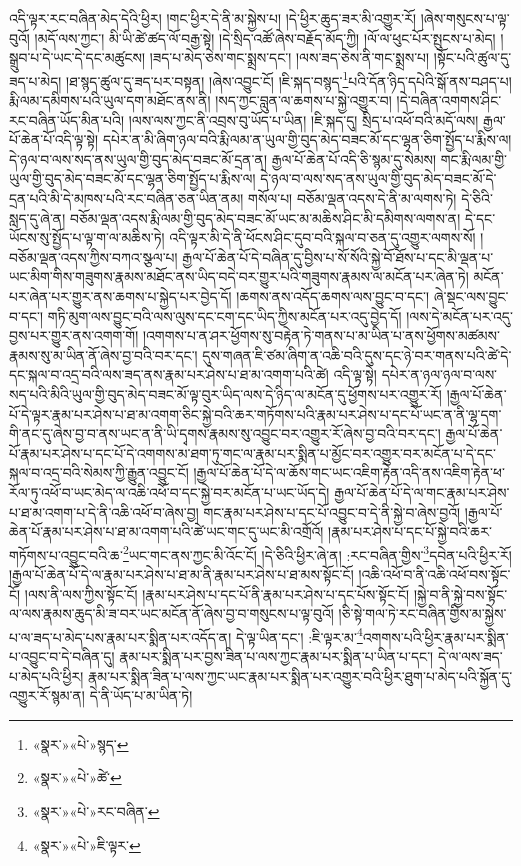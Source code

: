 འདི་ལྟར་རང་བཞིན་མེད་དེའི་ཕྱིར། །གང་ཕྱིར་དེ་ནི་མ་སྐྱེས་པ། །དེ་ཕྱིར་ཆུད་ཟར་མི་འགྱུར་རོ། །ཞེས་གསུངས་པ་ལྟ་བུའོ། །མདོ་ལས་ཀྱང་། མི་ཡི་ཚེ་ཚད་ལོ་བརྒྱ་སྟེ། །དེ་སྲིད་འཚོ་ཞེས་བརྗོད་མོད་ཀྱི། །ལོ་ལ་ཕུང་པོར་སྤུངས་པ་མེད། །སྒྲུབ་པ་དེ་ཡང་དེ་དང་མཚུངས། །ཟད་པ་མེད་ཅེས་གང་སྨྲས་དང་། །ལས་ཟད་ཅེས་ནི་གང་སྨྲས་པ། །སྟོང་པའི་ཚུལ་དུ་ཟད་པ་མེད། །ཐ་སྙད་ཚུལ་དུ་ཟད་པར་བསྟན། །ཞེས་འབྱུང་ངོ། །ཇི་སྐད་བསྙད་\footnote{«སྣར་»«པེ་»སྙད་}པའི་དོན་ཉིད་དཔེའི་སྒོ་ནས་བཤད་པ། རྨི་ལམ་དམིགས་པའི་ཡུལ་དག་མཐོང་ནས་ནི། །སད་ཀྱང་བླུན་ལ་ཆགས་པ་སྐྱེ་འགྱུར་བ། །དེ་བཞིན་འགགས་ཤིང་རང་བཞིན་ཡོད་མིན་པའི། །ལས་ལས་ཀྱང་ནི་འབྲས་བུ་ཡོད་པ་ཡིན། །ཇི་སྐད་དུ། སྲིད་པ་འཕོ་བའི་མདོ་ལས། རྒྱལ་པོ་ཆེན་པོ་འདི་ལྟ་སྟེ། དཔེར་ན་མི་ཞིག་ཉལ་བའི་རྨི་ལམ་ན་ཡུལ་གྱི་བུད་མེད་བཟང་མོ་དང་ལྷན་ཅིག་སྤྱོད་པ་རྨིས་ལ། དེ་ཉལ་བ་ལས་སད་ནས་ཡུལ་གྱི་བུད་མེད་བཟང་མོ་དྲན་ན། རྒྱལ་པོ་ཆེན་པོ་འདི་ཅི་སྙམ་དུ་སེམས། གང་རྨི་ལམ་གྱི་ཡུལ་གྱི་བུད་མེད་བཟང་མོ་དང་ལྷན་ཅིག་སྤྱོད་པ་རྨིས་ལ། དེ་ཉལ་བ་ལས་སད་ནས་ཡུལ་གྱི་བུད་མེད་བཟང་མོ་དེ་དྲན་པའི་མི་དེ་མཁས་པའི་རང་བཞིན་ཅན་ཡིན་ནམ། གསོལ་པ། བཅོམ་ལྡན་འདས་དེ་ནི་མ་ལགས་ཏེ། དེ་ཅིའི་སླད་དུ་ཞེ་ན། བཅོམ་ལྡན་འདས་རྨི་ལམ་གྱི་བུད་མེད་བཟང་མོ་ཡང་མ་མཆིས་ཤིང་མི་དམིགས་ལགས་ན། དེ་དང་ཡོངས་སུ་སྤྱོད་པ་ལྟ་ག་ལ་མཆིས་ཏེ། འདི་ལྟར་མི་དེ་ནི་ཕོངས་ཤིང་དུབ་བའི་སྐལ་བ་ཅན་དུ་འགྱུར་ལགས་སོ། །བཅོམ་ལྡན་འདས་ཀྱིས་བཀའ་སྩལ་པ། རྒྱལ་པོ་ཆེན་པོ་དེ་བཞིན་དུ་བྱིས་པ་སོ་སོའི་སྐྱེ་བོ་ཐོས་པ་དང་མི་ལྡན་པ་ཡང་མིག་གིས་གཟུགས་རྣམས་མཐོང་ནས་ཡིད་བདེ་བར་གྱུར་པའི་གཟུགས་རྣམས་ལ་མངོན་པར་ཞེན་ཏེ། མངོན་པར་ཞེན་པར་གྱུར་ནས་ཆགས་པ་སྐྱེད་པར་བྱེད་དོ། །ཆགས་ནས་འདོད་ཆགས་ལས་བྱུང་བ་དང་། ཞེ་སྡང་ལས་བྱུང་བ་དང་། གཏི་མུག་ལས་བྱུང་བའི་ལས་ལུས་དང་ངག་དང་ཡིད་ཀྱིས་མངོན་པར་འདུ་བྱེད་དོ། །ལས་དེ་མངོན་པར་འདུ་བྱས་པར་གྱུར་ནས་འགག་གོ། །འགགས་པ་ན་ཤར་ཕྱོགས་སུ་བརྟེན་ཏེ་གནས་པ་མ་ཡིན་པ་ནས་ཕྱོགས་མཚམས་རྣམས་སུ་མ་ཡིན་ནོ་ཞེས་བྱ་བའི་བར་དང་། དུས་གཞན་ཇི་ཙམ་ཞིག་ན་འཆི་བའི་དུས་དང་ཉེ་བར་གནས་པའི་ཚེ་དེ་དང་སྐལ་བ་འདྲ་བའི་ལས་ཟད་ནས་རྣམ་པར་ཤེས་པ་ཐ་མ་འགག་པའི་ཚེ། འདི་ལྟ་སྟེ། དཔེར་ན་ཉལ་ཉལ་བ་ལས་སད་པའི་མིའི་ཡུལ་གྱི་བུད་མེད་བཟང་མོ་ལྟ་བུར་ཡིད་ལས་དེ་ཉིད་ལ་མངོན་དུ་ཕྱོགས་པར་འགྱུར་རོ། །རྒྱལ་པོ་ཆེན་པོ་དེ་ལྟར་རྣམ་པར་ཤེས་པ་ཐ་མ་འགག་ཅིང་སྐྱེ་བའི་ཆར་གཏོགས་པའི་རྣམ་པར་ཤེས་པ་དང་པོ་ཡང་ན་ནི་ལྷ་དག་གི་ནང་དུ་ཞེས་བྱ་བ་ནས་ཡང་ན་ནི་ཡི་དྭགས་རྣམས་སུ་འབྱུང་བར་འགྱུར་རོ་ཞེས་བྱ་བའི་བར་དང་། རྒྱལ་པོ་ཆེན་པོ་རྣམ་པར་ཤེས་པ་དང་པོ་དེ་འགགས་མ་ཐག་ཏུ་གང་ལ་རྣམ་པར་སྨིན་པ་མྱོང་བར་འགྱུར་བར་མངོན་པ་དེ་དང་སྐལ་བ་འདྲ་བའི་སེམས་ཀྱི་རྒྱུན་འབྱུང་ངོ། །རྒྱལ་པོ་ཆེན་པོ་དེ་ལ་ཆོས་གང་ཡང་འཇིག་རྟེན་འདི་ནས་འཇིག་རྟེན་ཕ་རོལ་ཏུ་འཕོ་བ་ཡང་མེད་ལ་འཆི་འཕོ་བ་དང་སྐྱེ་བར་མངོན་པ་ཡང་ཡོད་དེ། རྒྱལ་པོ་ཆེན་པོ་དེ་ལ་གང་རྣམ་པར་ཤེས་པ་ཐ་མ་འགག་པ་དེ་ནི་འཆི་འཕོ་བ་ཞེས་བྱ། གང་རྣམ་པར་ཤེས་པ་དང་པོ་འབྱུང་བ་དེ་ནི་སྐྱེ་བ་ཞེས་བྱའོ། །རྒྱལ་པོ་ཆེན་པོ་རྣམ་པར་ཤེས་པ་ཐ་མ་འགག་པའི་ཚེ་ཡང་གང་དུ་ཡང་མི་འགྲོའོ། །རྣམ་པར་ཤེས་པ་དང་པོ་སྐྱེ་བའི་ཆར་གཏོགས་པ་འབྱུང་བའི་ཆ་\footnote{«སྣར་»«པེ་»ཚེ་}ཡང་གང་ནས་ཀྱང་མི་འོང་ངོ། །དེ་ཅིའི་ཕྱིར་ཞེ་ན། :རང་བཞིན་གྱིས་\footnote{«སྣར་»«པེ་»རང་བཞིན་}དབེན་པའི་ཕྱིར་རོ། །རྒྱལ་པོ་ཆེན་པོ་དེ་ལ་རྣམ་པར་ཤེས་པ་ཐ་མ་ནི་རྣམ་པར་ཤེས་པ་ཐ་མས་སྟོང་ངོ། །འཆི་འཕོ་བ་ནི་འཆི་འཕོ་བས་སྟོང་ངོ། །ལས་ནི་ལས་ཀྱིས་སྟོང་ངོ། །རྣམ་པར་ཤེས་པ་དང་པོ་ནི་རྣམ་པར་ཤེས་པ་དང་པོས་སྟོང་ངོ། །སྐྱེ་བ་ནི་སྐྱེ་བས་སྟོང་ལ་ལས་རྣམས་ཆུད་མི་ཟ་བར་ཡང་མངོན་ནོ་ཞེས་བྱ་བ་གསུངས་པ་ལྟ་བུའོ། །ཅི་སྟེ་གལ་ཏེ་རང་བཞིན་གྱིས་མ་སྐྱེས་པ་ལ་ཟད་པ་མེད་པས་རྣམ་པར་སྨིན་པར་འདོད་ན། དེ་ལྟ་ཡིན་དང་། :ཇི་ལྟར་མ་\footnote{«སྣར་»«པེ་»ཇི་ལྟར་}འགགས་པའི་ཕྱིར་རྣམ་པར་སྨིན་པ་འབྱུང་བ་དེ་བཞིན་དུ། རྣམ་པར་སྨིན་པར་བྱས་ཟིན་པ་ལས་ཀྱང་རྣམ་པར་སྨིན་པ་ཡིན་པ་དང་། དེ་ལ་ལས་ཟད་པ་མེད་པའི་ཕྱིར། རྣམ་པར་སྨིན་ཟིན་པ་ལས་ཀྱང་ཡང་རྣམ་པར་སྨིན་པར་འགྱུར་བའི་ཕྱིར་ཐུག་པ་མེད་པའི་སྐྱོན་དུ་འགྱུར་རོ་སྙམ་ན། དེ་ནི་ཡོད་པ་མ་ཡིན་ཏེ། 